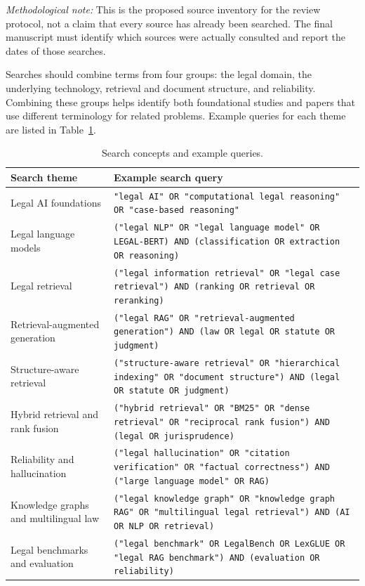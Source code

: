 \textit{Methodological note:} This is the proposed source inventory for the review protocol, not a
claim that every source has already been searched. The final manuscript must identify which
sources were actually consulted and report the dates of those searches.

Searches should combine terms from four groups: the legal domain, the underlying technology,
retrieval and document structure, and reliability. Combining these groups helps identify both
foundational studies and papers that use different terminology for related problems. Example
queries for each theme are listed in Table~\ref{tab:queries}.

\begin{table}[t]
\centering
\caption{Search concepts and example queries.}
\label{tab:queries}
\footnotesize
\setlength{\tabcolsep}{6pt}
\renewcommand{\arraystretch}{1.25}
\begin{tabularx}{\textwidth}{>{\raggedright\arraybackslash}p{4.0cm} >{\raggedright\arraybackslash}X}
\toprule
\textbf{Search theme} & \textbf{Example search query} \\
\midrule
Legal AI foundations & \texttt{"legal AI" OR "computational legal reasoning" OR "case-based reasoning"} \\
Legal language models & \texttt{("legal NLP" OR "legal language model" OR LEGAL-BERT) AND (classification OR extraction OR reasoning)} \\
Legal retrieval & \texttt{("legal information retrieval" OR "legal case retrieval") AND (ranking OR retrieval OR reranking)} \\
Retrieval-augmented generation & \texttt{("legal RAG" OR "retrieval-augmented generation") AND (law OR legal OR statute OR judgment)} \\
Structure-aware retrieval & \texttt{("structure-aware retrieval" OR "hierarchical indexing" OR "document structure") AND (legal OR statute OR judgment)} \\
Hybrid retrieval and rank fusion & \texttt{("hybrid retrieval" OR "BM25" OR "dense retrieval" OR "reciprocal rank fusion") AND (legal OR jurisprudence)} \\
Reliability and hallucination & \texttt{("legal hallucination" OR "citation verification" OR "factual correctness") AND ("large language model" OR RAG)} \\
Knowledge graphs and multilingual law & \texttt{("legal knowledge graph" OR "knowledge graph RAG" OR "multilingual legal retrieval") AND (AI OR NLP OR retrieval)} \\
Legal benchmarks and evaluation & \texttt{("legal benchmark" OR LegalBench OR LexGLUE OR "legal RAG benchmark") AND (evaluation OR reliability)} \\
\bottomrule
\end{tabularx}
\end{table}

